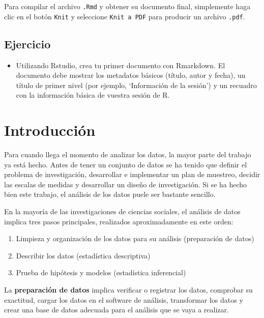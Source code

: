 \documentclass[
]{book}
\providecommand{\tightlist}{%
  \setlength{\itemsep}{0pt}\setlength{\parskip}{0pt}}
\begin{document}
Para compilar el archivo \texttt{.Rmd} y obtener su documento final, simplemente haga clic en el botón \texttt{Knit} y seleccione \texttt{Knit\ a\ PDF} para producir un archivo \texttt{.pdf}.

\hypertarget{ejercicio}{%
\section{Ejercicio}\label{ejercicio}}

\begin{itemize}
\tightlist
\item
  Utilizando Rstudio, crea tu primer documento con Rmarkdown. El documento debe mostrar los metadatos básicos (título, autor y fecha), un título de primer nivel (por ejemplo, `Información de la sesión') y un recuadro con la información básica de vuestra sesión de R.
\end{itemize}

\hypertarget{intro}{%
\chapter{Introducción}\label{intro}}

Para cuando llega el momento de analizar los datos, la mayor parte del trabajo ya está hecho. Antes de tener un conjunto de datos se ha tenido que definir el problema de investigación, desarrollar e implementar un plan de muestreo, decidir las escalas de medidas y desarrollar un diseño de investigación. Si se ha hecho bien este trabajo, el análisis de los datos puele ser bastante sencillo.

En la mayoría de las investigaciones de ciencias sociales, el análisis de datos implica tres pasos principales, realizados aproximadamente en este orden:

\begin{enumerate}
\def\labelenumi{\arabic{enumi}.}
\tightlist
\item
  Limpieza y organización de los datos para su análisis (preparación de datos)
\item
  Describir los datos (estadística descriptiva)
\item
  Prueba de hipótesis y modelos (estadística inferencial)
\end{enumerate}

La \textbf{preparación de datos} implica verificar o registrar los datos, comprobar su exactitud, cargar los datos en el software de análisis, transformar los datos y crear una base de datos adecuada para el análisis que se vaya a realizar.
\end{document}
